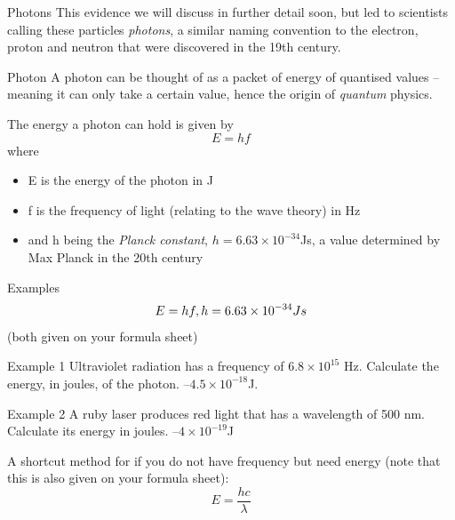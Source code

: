 \documentclass[../Main.tex]{subfiles}
\begin{document}
\begin{frame}{Photons}
    This evidence we will discuss in further detail soon, but led to scientists calling these particles \emph{photons}, a similar naming convention to the electron, proton and neutron that were discovered in the 19th century.
    
    \begin{block}{Photon}
    A photon can be thought of as a packet of energy of quantised values -- meaning it can only take a certain value, hence the origin of \emph{quantum} physics. 
    \end{block} \pause
    
    The energy a photon can hold is given by 
    \begin{equation*}
        E=hf
    \end{equation*}
    where
    \begin{itemize}
        \item E is the energy of the photon in J
        \item f is the frequency of light (relating to the wave theory) in Hz
        \item and h being the \emph{Planck constant}, $h=6.63\times10^{-34}$Js, a value determined by Max Planck in the 20th century
    \end{itemize}
\end{frame}

\begin{frame}{Examples}
\begin{equation*}
    E=hf, \newline h=6.63\times10^{-34}Js
\end{equation*} (both given on your formula sheet)

    \begin{exampleblock}{Example 1}
    Ultraviolet radiation has a frequency of $6.8 \times 10^{15}$ Hz. Calculate the energy, in joules, of the photon. \pause
    --$4.5\times 10^{-18}$J.
    \end{exampleblock} \pause
    
    \begin{exampleblock}{Example 2}
    A ruby laser produces red light that has a wavelength of 500 nm. Calculate its energy in joules. \pause
    --$4\times 10^{-19}$J
    \end{exampleblock} \pause
    A shortcut method for if you do not have frequency but need energy (note that this is also given on your formula sheet):
    \begin{equation*}
        E=\frac{hc}{\lambda}
    \end{equation*}
\end{frame}
\end{document}

